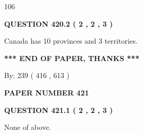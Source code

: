 \documentclass[12pt]{article}
\begin{document}
  
 
 
\noindent{}

106
 
 
  
\vspace{0.2in}
  
{\textbf{\Large{QUESTION
420.2 
 ( 2 , 2 , 3 )
}}}
  
  
 
 
\noindent{}
 
 
Canada has 10  provinces and 3 territories.
 
 
 
 
   
   
 \vspace{0.2in}
 
   
   
   
   
\vspace{1.0in} 
{\textbf{\large{ *** END OF PAPER, THANKS *** }}} 
   
   
\hspace{1.0in} By: 
 239 ( 416 ,  613 )
   
   
   
   
\newpage 
\setcounter{page}{ 
   421001 } 
   
   
   
   
 {\textbf{ \Large{ PAPER NUMBER  421  }}}
   
   
\vspace{0.2in}
   
   
   
   
   
   
 \vspace{0.2in}
 
 
 
 
   
   
  
\vspace{0.2in}
  
{\textbf{\Large{QUESTION
421.1 
 ( 2 , 2 , 3 )
}}}
  
  
 
 
\noindent{}
 
 
 None of above.
 
\end{document}
